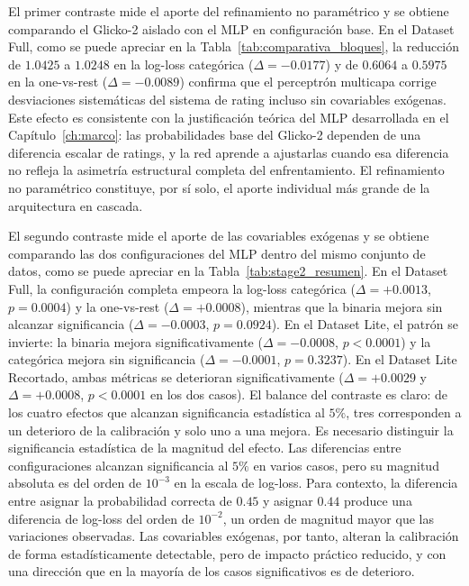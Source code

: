 El primer contraste mide el aporte del refinamiento no param\'etrico y se obtiene comparando el Glicko-2 aislado con el MLP en configuraci\'on base. En el Dataset Full, como se puede apreciar en la Tabla~\ref{tab:comparativa_bloques}, la reducci\'on de $1{.}0425$ a $1{.}0248$ en la log-loss categ\'orica ($\Delta = -0{.}0177$) y de $0{.}6064$ a $0{.}5975$ en la one-vs-rest ($\Delta = -0{.}0089$) confirma que el perceptr\'on multicapa corrige desviaciones sistem\'aticas del sistema de rating incluso sin covariables ex\'ogenas. Este efecto es consistente con la justificaci\'on te\'orica del MLP desarrollada en el Cap\'itulo~\ref{ch:marco}: las probabilidades base del Glicko-2 dependen de una diferencia escalar de ratings, y la red aprende a ajustarlas cuando esa diferencia no refleja la asimetr\'ia estructural completa del enfrentamiento. El refinamiento no param\'etrico constituye, por s\'i solo, el aporte individual m\'as grande de la arquitectura en cascada.

El segundo contraste mide el aporte de las covariables ex\'ogenas y se obtiene comparando las dos configuraciones del MLP dentro del mismo conjunto de datos, como se puede apreciar en la Tabla~\ref{tab:stage2_resumen}. En el Dataset Full, la configuraci\'on completa empeora la log-loss categ\'orica ($\Delta = +0{.}0013$, $p=0{.}0004$) y la one-vs-rest ($\Delta = +0{.}0008$), mientras que la binaria mejora sin alcanzar significancia ($\Delta = -0{.}0003$, $p=0{.}0924$). En el Dataset Lite, el patr\'on se invierte: la binaria mejora significativamente ($\Delta = -0{.}0008$, $p<0{.}0001$) y la categ\'orica mejora sin significancia ($\Delta = -0{.}0001$, $p=0{.}3237$). En el Dataset Lite Recortado, ambas m\'etricas se deterioran significativamente ($\Delta = +0{.}0029$ y $\Delta = +0{.}0008$, $p<0{.}0001$ en los dos casos). El balance del contraste es claro: de los cuatro efectos que alcanzan significancia estad\'istica al $5\%$, tres corresponden a un deterioro de la calibraci\'on y solo uno a una mejora. Es necesario distinguir la significancia estad\'istica de la magnitud del efecto. Las diferencias entre configuraciones alcanzan significancia al $5\%$ en varios casos, pero su magnitud absoluta es del orden de $10^{-3}$ en la escala de log-loss. Para contexto, la diferencia entre asignar la probabilidad correcta de $0{.}45$ y asignar $0{.}44$ produce una diferencia de log-loss del orden de $10^{-2}$, un orden de magnitud mayor que las variaciones observadas. Las covariables ex\'ogenas, por tanto, alteran la calibraci\'on de forma estad\'isticamente detectable, pero de impacto pr\'actico reducido, y con una direcci\'on que en la mayor\'ia de los casos significativos es de deterioro.

